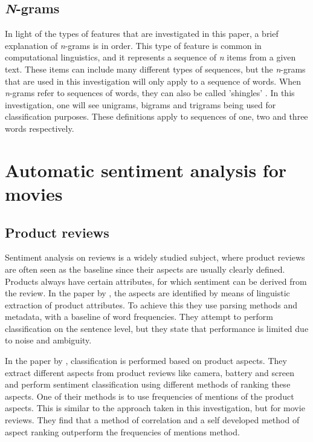 \documentclass[
10pt, %
a4paper, %
oneside, %
headinclude,footinclude, %
] {book}%
\begin{document}
\newpage

\subsection{\textit N-grams}

In light of the types of features that are investigated in this paper, a brief explanation of \textit n-grams is in order. This type of feature is common in computational linguistics, and it represents a sequence of \textit n items from a given text. These items can include many different types of sequences, but the \textit n-grams that are used in this investigation will only apply to a sequence of words. When \textit n-grams refer to sequences of words, they can also be called 'shingles' \citep{broder1997syntactic}. In this investigation, one will see unigrams, bigrams and trigrams being used for classification purposes. These definitions apply to sequences of one, two and three words respectively.

\section{Automatic sentiment analysis for movies}

\subsection{Product reviews}

Sentiment analysis on reviews is a widely studied subject, where product reviews are often seen as the baseline since their aspects are usually clearly defined. Products always have certain attributes, for which sentiment can be derived from the review. In the paper by \citet{dave2003mining}, the aspects are identified by means of linguistic extraction of product attributes. To achieve this they use parsing methods and metadata, with a baseline of word frequencies. They attempt to perform classification on the sentence level, but they state that performance is limited due to noise and ambiguity.

In the paper by \citet{yu2011aspect}, classification is performed based on product aspects. They extract different aspects from product reviews like camera, battery and screen and perform sentiment classification using different methods of ranking these aspects. One of their methods is to use frequencies of mentions of the product aspects. This is similar to the approach taken in this investigation, but for movie reviews. They find that a method of correlation and a self developed method of aspect ranking outperform the frequencies of mentions method.
\end{document}
